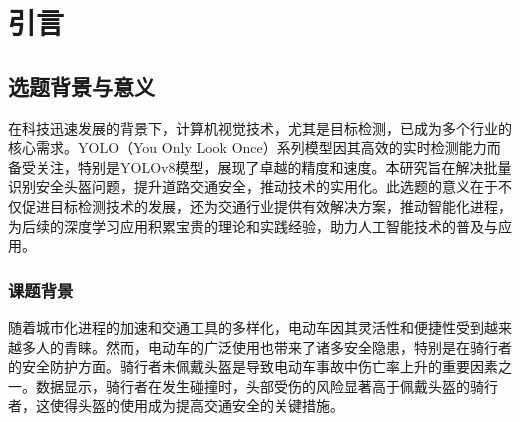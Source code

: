 \documentclass[journal]{IEEEtran}
\numberwithin{figure}{section}%
\begin{document}
\IEEEpeerreviewmaketitle

\section{引言}

\subsection{选题背景与意义}
在科技迅速发展的背景下，计算机视觉技术，尤其是目标检测，已成为多个行业的核心需求。YOLO（You Only Look Once）系列模型因其高效的实时检测能力而备受关注，特别是YOLOv8模型，展现了卓越的精度和速度。本研究旨在解决批量识别安全头盔问题，提升道路交通安全，推动技术的实用化。此选题的意义在于不仅促进目标检测技术的发展，还为交通行业提供有效解决方案，推动智能化进程，为后续的深度学习应用积累宝贵的理论和实践经验，助力人工智能技术的普及与应用。
\subsubsection{课题背景}
随着城市化进程的加速和交通工具的多样化，电动车因其灵活性和便捷性受到越来越多人的青睐。然而，电动车的广泛使用也带来了诸多安全隐患，特别是在骑行者的安全防护方面。骑行者未佩戴头盔是导致电动车事故中伤亡率上升的重要因素之一。数据显示，骑行者在发生碰撞时，头部受伤的风险显著高于佩戴头盔的骑行者，这使得头盔的使用成为提高交通安全的关键措施。\par
\end{document}
